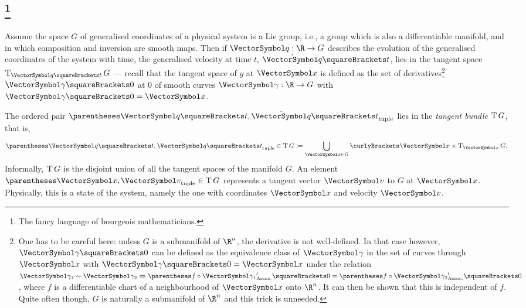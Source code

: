 \documentclass[10pt, a4paper, twoside]{lecturenotes}
\newcommand{\Rn}{{\R^n}}
\begin{document}
\begin{supplemental}
\subsection{\footnote{The fancy language of bourgeois mathematicians.}}
\begingroup
\newcommand{\VelocitySpace}{\LieAlgebraSymbol{g}}
\newcommand{\MomentumSpace}{\Dual\VelocitySpace}
\newcommand{\Lagrangian}{\mathscr{L}}
\newcommand{\Hamiltonian}{\mathscr{H}}
\newcommand{\eqrel}{\sim}
Assume the space $G$ of generalised coordinates of a physical system is a Lie group, i.e., a group which is also a differentiable manifold, and in which composition and inversion are smooth maps. Then if $\FunctionSpec\vq \R G$ describes the evolution of the generalised coordinates of the system with time, the generalised velocity at time $t$, $\TimeDerivative\vq\of t$, lies in the tangent space $\TangentSpace{\vq\of t}G$ --- recall that the tangent space of $g$ at $\vx$ is defined as the set of derivatives\footnote{One has to be careful here: unless $G$ is a submanifold of $\Rn$, the derivative is not well-defined. In that case however, $\TimeDerivative \vgg\of 0$ can be defined as the equivalence class of $\vgg$ in the set of curves through $\vx$ with $\vgg\of 0 = \vx$ under the relation $\vgg_1\eqrel\vgg_2 \Equivalent \pa{f\Compose\vgg_1}\der\of 0 = \pa{f\Compose\vgg_2}\der\of 0$, where $f$ is a differentiable chart of a neighbourhood of $\vx$ onto $\Rn$. It can then be shown that this is independent of $f$. Quite often though, $G$ is naturally a submanifold of $\Rn$ and this trick is unneeded.} $\TimeDerivative \vgg\of 0$ at $0$ of smooth curves $\FunctionSpec\vgg\R G$ with $\vgg\of 0 = \vx$.

The ordered pair $\tuple{\vq\of t,\TimeDerivative\vq\of t}$ lies in the \emph{tangent bundle} $\operatorname{T}{G}$, that is,
\begin{equation*}
\tuple{\vq\of t,\TimeDerivative\vq\of t} \in \TangentBundle G \DefineAs \UnionOver{\vx \in G} \set{\vx} \Cartesian \TangentSpace{\vx}G\text{.}
\end{equation*}
Informally, $\operatorname{T}{G}$ is the disjoint union of all the tangent spaces of the manifold $G$. An element $\tuple{\vx,\vv}\in \TangentBundle G$  represents a tangent vector $\vv$ to $G$ at $\vx$. Physically, this is a state of the system, namely the one with coordinates $\vx$ and velocity $\vv$. 


\end{supplemental}
\end{document}
